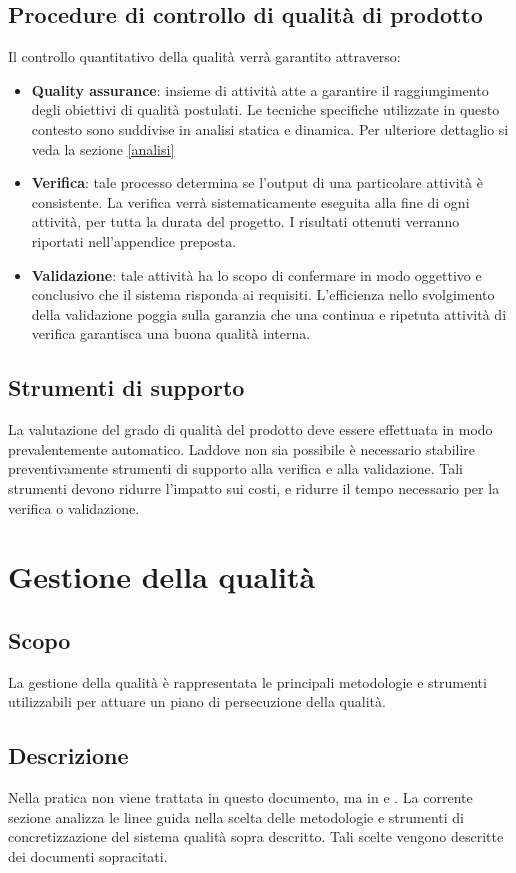 \documentclass[12pt,a4paper]{article}
\begin{document}
\subsection{Procedure di controllo di qualità di prodotto}\label{sec:procedure-di-controllo-di-qualità-di-prodotto}
Il controllo quantitativo della qualità verrà garantito attraverso:
\begin{itemize}
	\item{\textbf{Quality assurance}}: insieme di attività atte a garantire il raggiungimento degli obiettivi di qualità postulati. 
	Le tecniche specifiche utilizzate in questo contesto sono suddivise in analisi statica e dinamica. Per ulteriore dettaglio si veda la sezione \ref{analisi}
	\item{\textbf{Verifica}}: tale processo determina se l'output di una particolare attività è consistente. La verifica verrà sistematicamente eseguita alla fine di ogni attività, per tutta la durata del progetto. I risultati ottenuti verranno riportati nell'appendice preposta.
	\item{\textbf{Validazione}}: tale attività ha lo scopo di confermare in modo oggettivo e conclusivo che il sistema risponda ai requisiti. L'efficienza nello svolgimento della validazione poggia sulla garanzia che una continua e ripetuta attività di verifica garantisca una buona qualità interna.
\end{itemize}
\subsection{Strumenti di supporto}
La valutazione del grado di qualità del prodotto deve essere effettuata in modo prevalentemente automatico. Laddove non sia possibile è necessario stabilire preventivamente strumenti di supporto alla verifica e alla validazione. Tali strumenti devono ridurre l'impatto sui costi, e ridurre il tempo necessario per la verifica o validazione. 


\section{Gestione della qualità}\label{gest_qual}
\subsection{Scopo}
La gestione della qualità è rappresentata le principali metodologie e strumenti utilizzabili per attuare un piano di persecuzione della qualità. 

\subsection{Descrizione}
Nella pratica non viene trattata in questo documento, ma in \PdP e \NdP.
La corrente sezione analizza le linee guida nella scelta delle metodologie e strumenti di concretizzazione del sistema qualità sopra descritto. Tali scelte vengono descritte dei documenti sopracitati.
\end{document}
